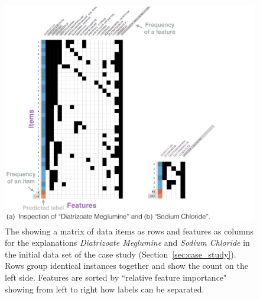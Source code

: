 \begin{figure}[b!]
\centering
\includegraphics[width=0.9\linewidth]{explainer/inspect1}
\caption{
The \textbf{\tabC} showing a matrix of data items as rows and features as columns for the explanations \emph{Diatrizoate Meglumine} and \emph{Sodium Chloride} in the initial data set of the case study (Section~\ref{sec:case_study}).
Rows group identical instances together and show the count on the left side.
Features are sorted by ``relative feature importance" showing from left to right how labels can be separated.
}
\label{figs:inspect_all}
\end{figure}